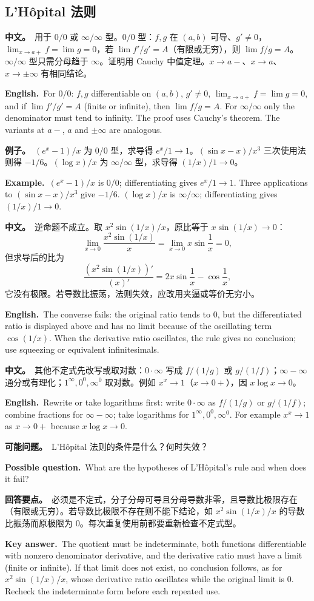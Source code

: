 \documentclass[UTF8,11pt,a4paper]{ctexart}
\newcommand{\BOTH}[2]{\par\noindent\textbf{中文。}\ #1\par\noindent\textbf{English.}\ #2\par}
\newcommand{\EX}[2]{\par\noindent\textbf{例子。}\ #1\par\noindent\textbf{Example.}\ #2\par}
\newcommand{\ASK}[4]{\begin{samepage}\par\noindent\textbf{可能问题。}\ #1\par\noindent\textbf{Possible question.}\ #2\par\noindent\textbf{回答要点。}\ #3\par\noindent\textbf{Key answer.}\ #4\medskip\end{samepage}}
\begin{document}
\subsection{L'H\^opital 法则}
\BOTH{用于 $0/0$ 或 $\infty/\infty$ 型。$0/0$ 型：$f,g$ 在 $(a,b)$ 可导、$g'\ne0$，$\lim_{x\to a+}f=\lim g=0$，若 $\lim f'/g'=A$（有限或无穷），则 $\lim f/g=A$。$\infty/\infty$ 型只需分母趋于 $\infty$。证明用 Cauchy 中值定理。$x\to a-$、$x\to a$、$x\to\pm\infty$ 有相同结论。}{For $0/0$: $f,g$ differentiable on $(a,b)$, $g'\ne0$, $\lim_{x\to a+}f=\lim g=0$, and if $\lim f'/g'=A$ (finite or infinite), then $\lim f/g=A$. For $\infty/\infty$ only the denominator must tend to infinity. The proof uses Cauchy's theorem. The variants at $a-$, $a$ and $\pm\infty$ are analogous.}
\EX{$(e^x-1)/x$ 为 $0/0$ 型，求导得 $e^x/1\to1$。$(\sin x-x)/x^3$ 三次使用法则得 $-1/6$。$(\log x)/x$ 为 $\infty/\infty$ 型，求导得 $(1/x)/1\to0$。}{$(e^x-1)/x$ is $0/0$; differentiating gives $e^x/1\to1$. Three applications to $(\sin x-x)/x^3$ give $-1/6$. $(\log x)/x$ is $\infty/\infty$; differentiating gives $(1/x)/1\to0$.}
\BOTH{逆命题不成立。取 $x^2\sin(1/x)/x$，原比等于 $x\sin(1/x)\to0$：
\[
\lim_{x\to0}\frac{x^2\sin(1/x)}{x}=\lim_{x\to0}x\sin\frac1x=0,
\]
但求导后的比为
\[
\frac{(x^2\sin(1/x))'}{(x)'}=2x\sin\frac1x-\cos\frac1x,
\]
它没有极限。若导数比振荡，法则失效，应改用夹逼或等价无穷小。}{The converse fails: the original ratio tends to $0$, but the differentiated ratio is displayed above and has no limit because of the oscillating term $\cos(1/x)$. When the derivative ratio oscillates, the rule gives no conclusion; use squeezing or equivalent infinitesimals.}
\BOTH{其他不定式先改写或取对数：$0\cdot\infty$ 写成 $f/(1/g)$ 或 $g/(1/f)$；$\infty-\infty$ 通分或有理化；$1^\infty,0^0,\infty^0$ 取对数。例如 $x^x\to1$（$x\to0+$），因 $x\log x\to0$。}{Rewrite or take logarithms first: write $0\cdot\infty$ as $f/(1/g)$ or $g/(1/f)$; combine fractions for $\infty-\infty$; take logarithms for $1^\infty,0^0,\infty^0$. For example $x^x\to1$ as $x\to0+$ because $x\log x\to0$.}
\ASK{L'H\^opital 法则的条件是什么？何时失效？}{What are the hypotheses of L'H\^opital's rule and when does it fail?}{必须是不定式，分子分母可导且分母导数非零，且导数比极限存在（有限或无穷）。若导数比极限不存在则不能下结论，如 $x^2\sin(1/x)/x$ 的导数比振荡而原极限为 $0$。每次重复使用前都要重新检查不定式型。}{The quotient must be indeterminate, both functions differentiable with nonzero denominator derivative, and the derivative ratio must have a limit (finite or infinite). If that limit does not exist, no conclusion follows, as for $x^2\sin(1/x)/x$, whose derivative ratio oscillates while the original limit is $0$. Recheck the indeterminate form before each repeated use.}
\end{document}

